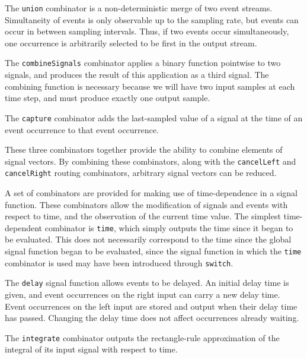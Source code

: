 The {\tt union} combinator is a non-deterministic merge of two event streams.
Simultaneity of events is only observable up to the sampling rate, but events
can occur in between sampling intervals. Thus, if two events occur
simultaneously, one occurrence is arbitrarily selected to be first in the output
stream.

The {\tt combineSignals} combinator applies a binary function pointwise to two
signals, and produces the result of this application as a third signal. The
combining function is necessary because we will have two input samples at each
time step, and must produce exactly one output sample.

The {\tt capture} combinator adds the last-sampled value of a signal at the time
of an event occurrence to that event occurrence.

These three combinators  together provide the ability to combine elements of
signal vectors. By combining these combinators, along with the {\tt cancelLeft}
and {\tt cancelRight} routing combinators, arbitrary signal vectors can be
reduced.

A set of combinators are provided for making use of time-dependence in a signal
function. These combinators allow the modification of signals and events with
respect to time, and the observation of the current time value.
%
The simplest time-dependent combinator is {\tt time}, which simply outputs
the time since it began to be evaluated. This does not necessarily correspond to
the time since the global signal function began to be evaluated, since the
signal function in which the {\tt time} combinator is used may have been
introduced through {\tt switch}.


The {\tt delay} signal function allows events to be delayed. An initial delay
time is given, and event occurrences on the right input can carry a new delay
time. Event occurrences on the left input are stored and output when their delay
time has passed. Changing the delay time does not affect occurrences already
waiting.

The {\tt integrate} combinator outputs the rectangle-rule approximation of the
integral of its input signal with respect to time.


